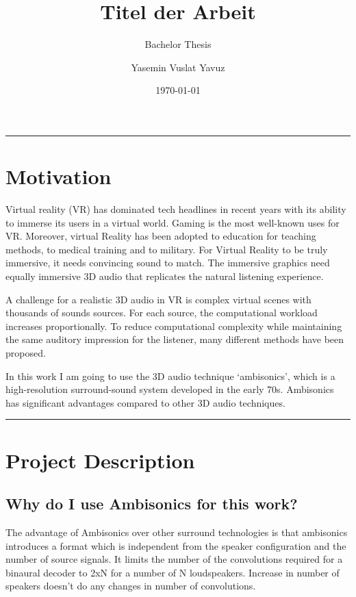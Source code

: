 \documentclass[lang=ngerman,inputenc=utf8,fontsize=10pt]{ldvarticle}
\title{Titel der Arbeit}
\subtitle{Bachelor Thesis}
\author{Yasemin Vuslat Yavuz}
\date{\today}
\begin{document}
	\maketitle
	\thispagestyle{empty}
	\vspace*{3cm}
	\hrule


\section*{Motivation}

Virtual reality (VR) has dominated tech headlines in recent years with its ability to immerse its users in a virtual world. Gaming is the most well-known uses for VR. Moreover, virtual Reality has been adopted to education for teaching methods, to medical training and to military. 
For Virtual Reality to be truly immersive, it needs convincing sound to match. The immersive graphics need equally immersive 3D audio that replicates the natural listening experience. 

A challenge for a realistic 3D audio in VR is complex virtual scenes with thousands of sounds sources. For each source, the computational workload increases proportionally. To reduce computational complexity while maintaining the same auditory impression for the listener, many different methods have been proposed. 

In this work I am going to use the 3D audio technique ‘ambisonics’, which is a high-resolution surround-sound system developed in the early 70s. Ambisonics has significant advantages compared to other 3D audio techniques. 

\vspace*{1cm}
\hrule




\newpage
\section{Project Description }

\subsection{Why do I use Ambisonics for this work?}

The advantage of Ambisonics over other surround technologies is that ambisonics introduces a format which is independent from the speaker configuration and the number of source signals. It limits the number of the convolutions required for a binaural decoder to 2xN for a number of N loudspeakers. Increase in number of speakers doesn't do any changes in number of convolutions. 
\end{document}
